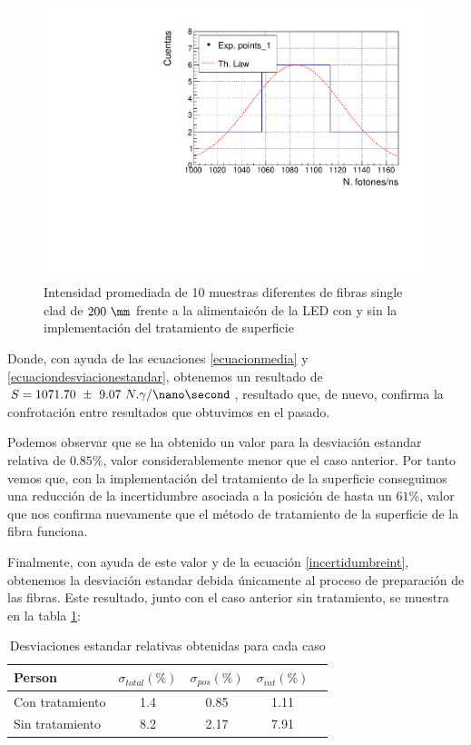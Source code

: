 \begin{figure}[hbtp]
\centering
\includegraphics[scale=0.7]{Figuras/singlecladsigmaposgausclean.pdf}
\caption{Intensidad promediada de 10 muestras diferentes de fibras single clad de $200~\mm$ frente a la alimentaicón de la LED con y sin la implementación del tratamiento de superficie\label{promediosinglecladlimpieza}}
\end{figure}

Donde, con ayuda de las ecuaciones \ref{ecuacionmedia} y \ref{ecuaciondesviacionestandar}, obtenemos un resultado de $S=1071.70~\pm~9.07~N. \gamma/\nano\second$, resultado que, de nuevo, confirma la confrotación entre resultados que obtuvimos en el pasado.

 Podemos observar que se ha obtenido un valor para la desviación estandar relativa de $0.85\%$, valor considerablemente menor que el caso anterior. Por tanto vemos que, con la implementación del tratamiento de la superficie conseguimos una reducción de la incertidumbre asociada a la posición de hasta un $61\%$, valor que nos confirma nuevamente que el método de tratamiento de la superficie de la fibra funciona.
 
Finalmente, con ayuda de este valor y de la ecuación \ref{incertidumbreint}, obtenemos la desviación estandar debida únicamente al proceso de preparación de las fibras. Este resultado, junto con el caso anterior sin tratamiento, se muestra en la tabla \ref{resultadofinalclean}:

\begin{table}[H]
\begin{center}
\begin{tabular}{l | c | c | c | c }
Person & $\sigma_{total} (\%) $ & $\sigma_{pos} (\%)$ & $\sigma_{int} (\%)$\\
\hline \hline
Con tratamiento & 1.4  & 0.85 & 1.11\\ 
Sin tratamiento & 8.2 & 2.17 & 7.91\\
\end{tabular}
\caption{Desviaciones estandar relativas obtenidas para cada caso\label{resultadofinalclean}}
\end{center}
\end{table}

